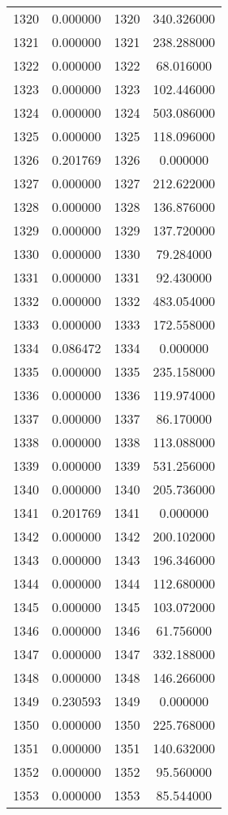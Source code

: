 \documentclass[12pt]{article}
\begin{document}
\begin{longtable}{@{}cccc@{}}
1320 & 0.000000 & 1320 & 340.326000 \\
1321 & 0.000000 & 1321 & 238.288000 \\
1322 & 0.000000 & 1322 & 68.016000 \\
1323 & 0.000000 & 1323 & 102.446000 \\
1324 & 0.000000 & 1324 & 503.086000 \\
1325 & 0.000000 & 1325 & 118.096000 \\
1326 & 0.201769 & 1326 & 0.000000 \\
1327 & 0.000000 & 1327 & 212.622000 \\
1328 & 0.000000 & 1328 & 136.876000 \\
1329 & 0.000000 & 1329 & 137.720000 \\
1330 & 0.000000 & 1330 & 79.284000 \\
1331 & 0.000000 & 1331 & 92.430000 \\
1332 & 0.000000 & 1332 & 483.054000 \\
1333 & 0.000000 & 1333 & 172.558000 \\
1334 & 0.086472 & 1334 & 0.000000 \\
1335 & 0.000000 & 1335 & 235.158000 \\
1336 & 0.000000 & 1336 & 119.974000 \\
1337 & 0.000000 & 1337 & 86.170000 \\
1338 & 0.000000 & 1338 & 113.088000 \\
1339 & 0.000000 & 1339 & 531.256000 \\
1340 & 0.000000 & 1340 & 205.736000 \\
1341 & 0.201769 & 1341 & 0.000000 \\
1342 & 0.000000 & 1342 & 200.102000 \\
1343 & 0.000000 & 1343 & 196.346000 \\
1344 & 0.000000 & 1344 & 112.680000 \\
1345 & 0.000000 & 1345 & 103.072000 \\
1346 & 0.000000 & 1346 & 61.756000 \\
1347 & 0.000000 & 1347 & 332.188000 \\
1348 & 0.000000 & 1348 & 146.266000 \\
1349 & 0.230593 & 1349 & 0.000000 \\
1350 & 0.000000 & 1350 & 225.768000 \\
1351 & 0.000000 & 1351 & 140.632000 \\
1352 & 0.000000 & 1352 & 95.560000 \\
1353 & 0.000000 & 1353 & 85.544000 \\

\end{longtable}
\end{document}
